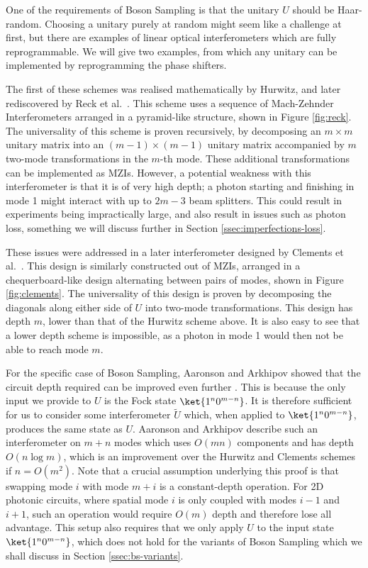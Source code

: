 One of the requirements of Boson Sampling is that the unitary $U$ should be Haar-random. Choosing a unitary purely at random might seem like a challenge at first, but there are examples of linear optical interferometers which are fully reprogrammable. We will give two examples, from which any unitary can be implemented by reprogramming the phase shifters.

The first of these schemes was realised mathematically by Hurwitz, and later rediscovered by Reck et al.~\cite{hurwitz1897, reck1994}. This scheme uses a sequence of Mach-Zehnder Interferometers arranged in a pyramid-like structure, shown in Figure \ref{fig:reck}. The universality of this scheme is proven recursively, by decomposing an $m\times m$ unitary matrix into an $(m-1)\times(m-1)$ unitary matrix accompanied by $m$ two-mode transformations in the $m$-th mode. These additional transformations can be implemented as MZIs. However, a potential weakness with this interferometer is that it is of very high depth; a photon starting and finishing in mode 1 might interact with up to $2m-3$ beam splitters. This could result in experiments being impractically large, and also result in issues such as photon loss, something we will discuss further in Section \ref{ssec:imperfections-loss}.

These issues were addressed in a later interferometer designed by Clements et al.~\cite{clements2016}. This design is similarly constructed out of MZIs, arranged in a chequerboard-like design alternating between pairs of modes, shown in Figure \ref{fig:clements}. The universality of this design is proven by decomposing the diagonals along either side of $U$ into two-mode transformations. This design has depth $m$, lower than that of the Hurwitz scheme above. It is also easy to see that a lower depth scheme is impossible, as a photon in mode 1 would then not be able to reach mode $m$.

For the specific case of Boson Sampling, Aaronson and Arkhipov showed that the circuit depth required can be improved even further \cite{aaronson2011, aaronson2010report}. This is because the only input we provide to $U$ is the Fock state $\ket{1^n0^{m-n}}$. It is therefore sufficient for us to consider some interferometer $\tilde{U}$ which, when applied to $\ket{1^n0^{m-n}}$, produces the same state as $U$. Aaronson and Arkhipov describe such an interferometer on $m+n$ modes which uses $O(mn)$ components and has depth $O(n\log m)$, which is an improvement over the Hurwitz and Clements schemes if $n=O(m^2)$. Note that a crucial assumption underlying this proof is that swapping mode $i$ with mode $m+i$ is a constant-depth operation. For 2D photonic circuits, where spatial mode $i$ is only coupled with modes $i-1$ and $i+1$, such an operation would require $O(m)$ depth and therefore lose all advantage. This setup also requires that we only apply $U$ to the input state $\ket{1^n0^{m-n}}$, which does not hold for the variants of Boson Sampling which we shall discuss in Section \ref{ssec:bs-variants}.

